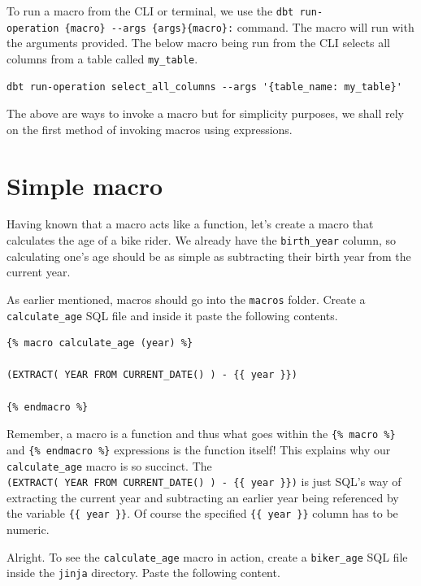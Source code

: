 \documentclass[
]{book}
\begin{document}
To run a macro from the CLI or terminal, we use the \texttt{dbt\ run-operation\ \{macro\}\ -\/-args\ \textquotesingle{}\{args\}\textquotesingle{}\{macro\}:} command. The macro will run with the arguments provided. The below macro being run from the CLI selects all columns from a table called \texttt{my\_table}.

\begin{verbatim}
dbt run-operation select_all_columns --args '{table_name: my_table}'
\end{verbatim}

The above are ways to invoke a macro but for simplicity purposes, we shall rely on the first method of invoking macros using expressions.

\hypertarget{simple-macro}{%
\section{Simple macro}\label{simple-macro}}

Having known that a macro acts like a function, let's create a macro that calculates the age of a bike rider. We already have the \texttt{birth\_year} column, so calculating one's age should be as simple as subtracting their birth year from the current year.

As earlier mentioned, macros should go into the \texttt{macros} folder. Create a \texttt{calculate\_age} SQL file and inside it paste the following contents.

\begin{verbatim}
{% macro calculate_age (year) %}

(EXTRACT( YEAR FROM CURRENT_DATE() ) - {{ year }}) 

{% endmacro %}
\end{verbatim}

Remember, a macro is a function and thus what goes within the \texttt{\{\%\ macro\ \%\}} and \texttt{\{\%\ endmacro\ \%\}} expressions is the function itself! This explains why our \texttt{calculate\_age} macro is so succinct. The \texttt{(EXTRACT(\ YEAR\ FROM\ CURRENT\_DATE()\ )\ -\ \{\{\ year\ \}\})} is just SQL's way of extracting the current year and subtracting an earlier year being referenced by the variable \texttt{\{\{\ year\ \}\}}. Of course the specified \texttt{\{\{\ year\ \}\}} column has to be numeric.

Alright. To see the \texttt{calculate\_age} macro in action, create a \texttt{biker\_age} SQL file inside the \texttt{jinja} directory. Paste the following content.
\end{document}
